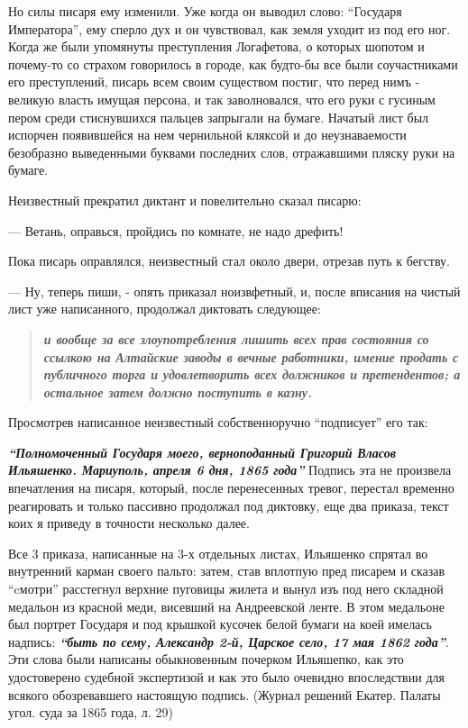 
Но силы писаря ему изменили. Уже когда он выводил слово: \enquote{Государя
Императора}, ему сперло дух и он чувствовал, как земля уходит из под его ног.
Когда же были упомянуты преступления Логафетова, о которых шопотом и почему-то
со страхом говорилось в городе, как будто-бы все были соучастниками его
преступлений, писарь всем своим существом постиг, что перед нимъ - великую
власть имущая персона, и так заволновался, что его руки с гусиным пером среди
стиснувшихся пальцев запрыгали на бумаге. Начатый лист был испорчен появившейся
на нем чернильной кляксой и до неузнаваемости безобразно выведенными буквами
последних слов, отражавшими пляску руки на бумаге.

Неизвестный прекратил диктант и повелительно сказал писарю:

— Ветань, оправься, пройдись по комнате, не надо дрефить!

Пока писарь оправлялся, неизвестный стал около двери, отрезав путь к бегству. 

— Ну, теперь пиши, - опять приказал ноизвфетный, и, после вписания на чистый
лист уже написанного, продолжал диктовать следующее:
\begin{quote}
\em\bfseries
и вообще за все злоупотребления лишить всех прав состояния со ссылкою на Алтайские заводы 
в вечные работники, имение продать с публичного торга и удовлетворить всех должников и претендентов; а остальное затем
должно поступить в казну.
\end{quote}

Просмотрев написанное неизвестный собственноручно ``подписует'' его так: 

\textbf{\em ``Полномоченный Государя моего, верноподанный Григорий Власов Ильяшенко. Мариуполь, апреля 6 дня, 1865 года''}
Подпись эта не произвела впечатления
на писаря, который, после перенесенных тревог, перестал временно реагировать и
только пассивно продолжал под диктовку, еще два приказа, текст коих я приведу в
точности несколько далее.

Все 3 приказа, написанные на 3-х отдельных листах, Ильяшенко спрятал во
внутренний карман своего пальто: затем, став вплотпую пред писарем и сказав
``cмотри'' расстегнул верхние пуговицы жилета и вынул изъ под него складной
медальон из красной меди, висевший на Андреевской ленте.  В этом медальоне был
портрет Государя и под крышкой кусочек белой бумаги на коей имелась надпись:
\textbf{\em ``быть по сему, Александр 2-й, Царское село, 17 мая 1862 года''}.
Эти слова были написаны обыкновенным почерком Ильяшепко, как это удостоверено
судебной экспертизой и как это было очевидно впоследствии для всякого
обозревавшего настоящую подпись. (Журнал решений Екатер. Палаты угол. суда за
1865 года, л. 29)

